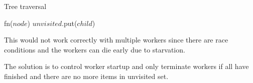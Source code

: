 \begin{algorithm}[H]
    \caption{Tree traversal}
\begin{algorithmic}[1]

        
        \Spawn
                \State fn($node$)
                        \State $unvisited$.put($child$)
                    \EndIf
                \EndFor
            \EndWhile
        \EndSpawn

    \EndFunction
\end{algorithmic}
\end{algorithm}

This would not work correctly with multiple workers since there are race conditions and the workers can die early due to starvation.

The solution is to control worker startup and only terminate workers if all have finished and there are no more items in unvisited set.


